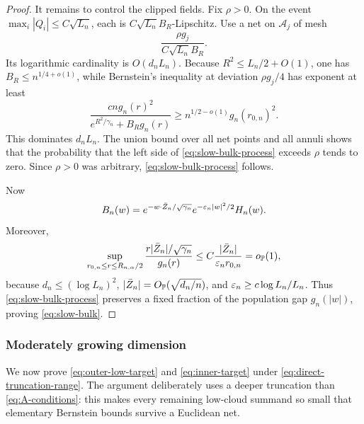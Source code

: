 \begin{proof}
It remains to control the clipped fields.  Fix \(\rho>0\).  On the event
\(\max_i|Q_i|\le C\sqrt{L_n}\), each is
\(C\sqrt{L_n}B_R\)-Lipschitz.  Use a net on \(\mathcal A_j\) of mesh
\[
 \frac{\rho g_j}{C\sqrt{L_n}B_R}.
\]
Its logarithmic cardinality is \(O(d_nL_n)\).  Because
\(R^2\le L_n/2+O(1)\), one has \(B_R\le n^{1/4+o(1)}\), while Bernstein's
inequality at deviation \(\rho g_j/4\) has exponent at least
\[
 \frac{c n g_n(r)^2}{e^{R^2/\gamma_n}+B_Rg_n(r)}
 \ge n^{1/2-o(1)}g_n(r_{0,n})^2.
\]
This dominates \(d_nL_n\).  The union bound over all net points and all
annuli shows that the probability that the left side of
\eqref{eq:slow-bulk-process} exceeds \(\rho\) tends to zero.  Since
\(\rho>0\) was arbitrary, \eqref{eq:slow-bulk-process} follows.

Now
\[
 B_n(w)
 =e^{-w\cdot\bar Z_n/\sqrt{\gamma_n}}
   e^{-\varepsilon_n|w|^2/2}H_n(w).
\]
Moreover,
\[
 \sup_{r_{0,n}\le r\le R_{n,\alpha}/2}
 \frac{r|\bar Z_n|/\sqrt{\gamma_n}}{g_n(r)}
 \le
 C\frac{|\bar Z_n|}{\varepsilon_nr_{0,n}}
 =o_{\mathbb P}(1),
\]
because \(d_n\le(\log L_n)^2\),
\(|\bar Z_n|=O_{\mathbb P}(\sqrt{d_n/n})\), and
\(\varepsilon_n\ge c\log L_n/L_n\).  Thus
\eqref{eq:slow-bulk-process} preserves a fixed fraction of the population
gap \(g_n(|w|)\), proving \eqref{eq:slow-bulk}.
\end{proof}


\subsubsection{Moderately growing dimension}
\label{sec:moderate-dimensional-theorem}

We now prove \eqref{eq:outer-low-target} and \eqref{eq:inner-target} under
\eqref{eq:direct-truncation-range}. The
argument deliberately uses a deeper truncation than
\eqref{eq:A-conditions}: this makes every remaining low-cloud summand so
small that elementary Bernstein bounds survive a Euclidean net.

